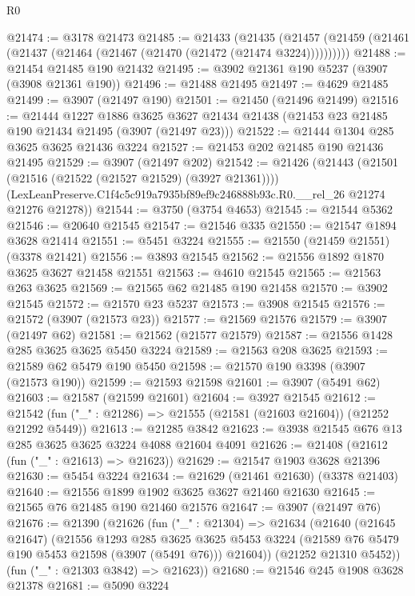 \begin{lexlean}{R0}
\begin{coremodule}
@21474 := @3178 @21473
@21485 := @21433
    (@21435 (@21457 (@21459 (@21461 (@21437 (@21464 (@21467 (@21470 (@21472 (@21474 @3224))))))))))
@21488 := @21454 @21485 @190 @21432
@21495 := @3902 @21361 @190 @5237 (@3907 (@3908 @21361 @190))
@21496 := @21488 @21495
@21497 := @4629 @21485
@21499 := @3907 (@21497 @190)
@21501 := @21450 (@21496 @21499)
@21516 := @21444
    @1227
    @1886
    @3625
    @3627
    @21434
    @21438
    (@21453 @23 @21485 @190 @21434 @21495 (@3907 (@21497 @23)))
@21522 := @21444 @1304 @285 @3625 @3625 @21436 @3224
@21527 := @21453 @202 @21485 @190 @21436 @21495
@21529 := @3907 (@21497 @202)
@21542 := @21426
    (@21443
      (@21501 (@21516 (@21522 (@21527 @21529) (@3927 @21361))))
      (LexLeanPreserve.C1f4c5c919a7935bf89ef9c246888b93c.R0.__rel_26 @21274 @21276 @21278))
@21544 := @3750 (@3754 @4653)
@21545 := @21544 @5362
@21546 := @20640 @21545
@21547 := @21546 @335
@21550 := @21547 @1894 @3628 @21414
@21551 := @5451 @3224
@21555 := @21550 (@21459 @21551) (@3378 @21421)
@21556 := @3893 @21545
@21562 := @21556 @1892 @1870 @3625 @3627 @21458 @21551
@21563 := @4610 @21545
@21565 := @21563 @263 @3625
@21569 := @21565 @62 @21485 @190 @21458
@21570 := @3902 @21545
@21572 := @21570 @23 @5237
@21573 := @3908 @21545
@21576 := @21572 (@3907 (@21573 @23))
@21577 := @21569 @21576
@21579 := @3907 (@21497 @62)
@21581 := @21562 (@21577 @21579)
@21587 := @21556 @1428 @285 @3625 @3625 @5450 @3224
@21589 := @21563 @208 @3625
@21593 := @21589 @62 @5479 @190 @5450
@21598 := @21570 @190 @3398 (@3907 (@21573 @190))
@21599 := @21593 @21598
@21601 := @3907 (@5491 @62)
@21603 := @21587 (@21599 @21601)
@21604 := @3927 @21545
@21612 := @21542 (fun ("_" : @21286) => @21555 (@21581 (@21603 @21604)) (@21252 @21292 @5449))
@21613 := @21285 @3842
@21623 := @3938 @21545 @676 @13 @285 @3625 @3625 @3224 @4088 @21604 @4091
@21626 := @21408 (@21612 (fun ("_" : @21613) => @21623))
@21629 := @21547 @1903 @3628 @21396
@21630 := @5454 @3224
@21634 := @21629 (@21461 @21630) (@3378 @21403)
@21640 := @21556 @1899 @1902 @3625 @3627 @21460 @21630
@21645 := @21565 @76 @21485 @190 @21460 @21576
@21647 := @3907 (@21497 @76)
@21676 := @21390
    (@21626
      (fun ("_" : @21304) =>
      @21634
        (@21640
          (@21645 @21647)
          (@21556
            @1293
            @285
            @3625
            @3625
            @5453
            @3224
            (@21589 @76 @5479 @190 @5453 @21598 (@3907 (@5491 @76)))
            @21604))
        (@21252 @21310 @5452))
      (fun ("_" : @21303 @3842) => @21623))
@21680 := @21546 @245 @1908 @3628 @21378
@21681 := @5090 @3224

\end{coremodule}
\end{lexlean}
